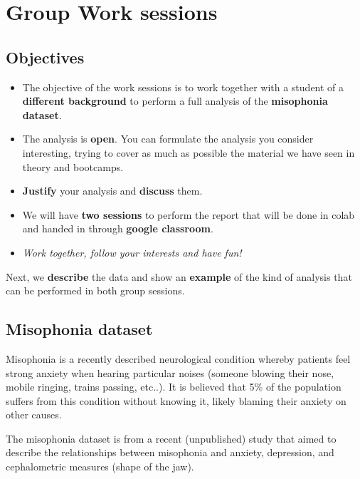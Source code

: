\documentclass[
]{book}
\begin{document}
\hypertarget{group-work-sessions}{%
\chapter{Group Work sessions}\label{group-work-sessions}}

\hypertarget{objectives}{%
\section{Objectives}\label{objectives}}

\begin{itemize}
\item
  The objective of the work sessions is to work together with a student of a \textbf{different background} to perform a full analysis of the \textbf{misophonia dataset}.
\item
  The analysis is \textbf{open}. You can formulate the analysis you consider interesting, trying to cover as much as possible the material we have seen in theory and bootcamps.
\item
  \textbf{Justify} your analysis and \textbf{discuss} them.
\item
  We will have \textbf{two sessions} to perform the report that will be done in colab and handed in through \textbf{google classroom}.
\item
  \emph{Work together, follow your interests and have fun!}
\end{itemize}

Next, we \textbf{describe} the data and show an \textbf{example} of the kind of analysis that can be performed in both group sessions.

\hypertarget{misophonia-dataset}{%
\section{Misophonia dataset}\label{misophonia-dataset}}

Misophonia is a recently described neurological condition whereby patients feel strong anxiety when hearing particular noises (someone blowing their nose, mobile ringing, trains passing, etc..). It is believed that 5\% of the population suffers from this condition without knowing it, likely blaming their anxiety on other causes.

The misophonia dataset is from a recent (unpublished) study that aimed to describe the relationships between misophonia and anxiety, depression, and cephalometric measures (shape of the jaw).
\end{document}
